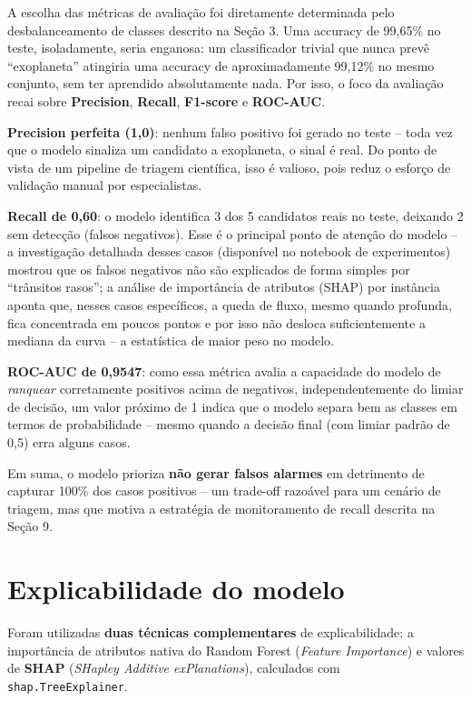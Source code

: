 \documentclass[12pt,a4paper]{article}
\begin{document}
A escolha das métricas de avaliação foi diretamente determinada pelo desbalanceamento de classes descrito na Seção 3. Uma accuracy de 99,65\% no teste, isoladamente, seria enganosa: um classificador trivial que nunca prevê ``exoplaneta'' atingiria uma accuracy de aproximadamente 99,12\% no mesmo conjunto, sem ter aprendido absolutamente nada. Por isso, o foco da avaliação recai sobre \textbf{Precision}, \textbf{Recall}, \textbf{F1-score} e \textbf{ROC-AUC}.

\textbf{Precision perfeita (1,0)}: nenhum falso positivo foi gerado no teste -- toda vez que o modelo sinaliza um candidato a exoplaneta, o sinal é real. Do ponto de vista de um pipeline de triagem científica, isso é valioso, pois reduz o esforço de validação manual por especialistas.

\textbf{Recall de 0,60}: o modelo identifica 3 dos 5 candidatos reais no teste, deixando 2 sem detecção (falsos negativos). Esse é o principal ponto de atenção do modelo -- a investigação detalhada desses casos (disponível no notebook de experimentos) mostrou que os falsos negativos não são explicados de forma simples por ``trânsitos rasos''; a análise de importância de atributos (SHAP) por instância aponta que, nesses casos específicos, a queda de fluxo, mesmo quando profunda, fica concentrada em poucos pontos e por isso não desloca suficientemente a mediana da curva -- a estatística de maior peso no modelo.

\textbf{ROC-AUC de 0,9547}: como essa métrica avalia a capacidade do modelo de \emph{ranquear} corretamente positivos acima de negativos, independentemente do limiar de decisão, um valor próximo de 1 indica que o modelo separa bem as classes em termos de probabilidade -- mesmo quando a decisão final (com limiar padrão de 0,5) erra alguns casos.

Em suma, o modelo prioriza \textbf{não gerar falsos alarmes} em detrimento de capturar 100\% dos casos positivos -- um trade-off razoável para um cenário de triagem, mas que motiva a estratégia de monitoramento de recall descrita na Seção 9.


\section{Explicabilidade do modelo}

Foram utilizadas \textbf{duas técnicas complementares} de explicabilidade: a importância de atributos nativa do Random Forest (\textit{Feature Importance}) e valores de \textbf{SHAP} (\textit{SHapley Additive exPlanations}), calculados com \texttt{shap.TreeExplainer}.
\end{document}
